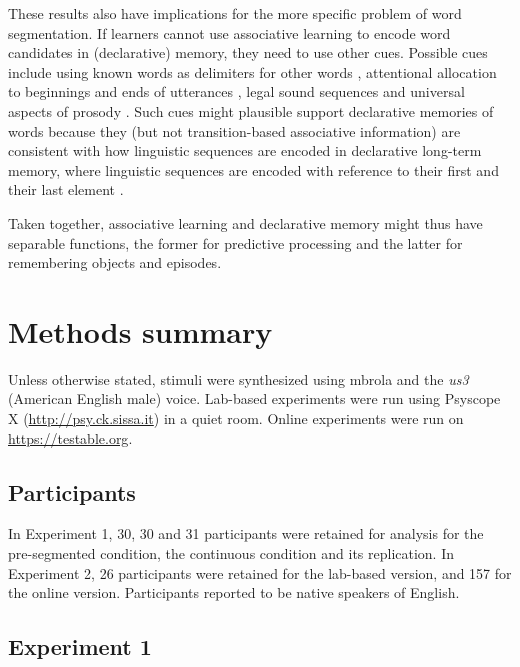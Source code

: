 \documentclass[]{article}
\begin{document}
These results also have implications for the more specific problem of word segmentation. If learners cannot use associative learning to encode word candidates in (declarative) memory, they need to use other cues. Possible cues include using known words as delimiters for other words \citep{Bortfeld2005, Brent2001, Mersad2012}, attentional allocation to beginnings and ends of utterances \citep{Monaghan2010, Seidl2008, Shukla2007}, legal sound sequences \citep{McQueen1998, Salverda2007} and universal aspects of prosody \citep{Brentari2011, Christophe2001, Endress-cross-seg, Fenlon2008, Johnson2009, Pilon1981}. Such cues might plausible support declarative memories of words because they (but not transition-based associative information) are consistent with how linguistic sequences are encoded in declarative long-term memory, where linguistic sequences are encoded with reference to their first and their last element \citep{Endress-Phantoms-Vision, Fischer-Baum2011}. 

Taken together, associative learning and declarative memory might thus have separable functions, the former for predictive processing and the latter for remembering objects and episodes.

\clearpage

\section{Methods summary}

Unless otherwise stated, stimuli were synthesized using mbrola \citep{mbrola} and the \emph{us3} (American English male) voice. Lab-based experiments were run using Psyscope X (\url{http://psy.ck.sissa.it}) in a quiet room. Online experiments were run on \url{https://testable.org}.

\subsection{Participants}\label{participants}

In Experiment 1, 30, 30 and 31 participants were retained for analysis for the pre-segmented condition, the continuous condition and its replication. In Experiment 2, 26 participants were retained for the lab-based version, and 157 for the online version. Participants reported to be native speakers of English.

\subsection{Experiment 1}
\end{document}
